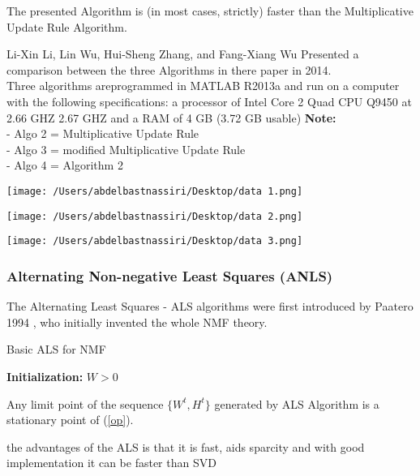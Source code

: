 \documentclass[aspectratio=169]{beamer}
\begin{document}
\begin{frame}
    \begin{theorem}
        The presented Algorithm is (in most cases, strictly) faster than the Multiplicative Update Rule
        Algorithm.
    \end{theorem}
\end{frame}
\begin{frame}
        Li-Xin Li, Lin Wu, Hui-Sheng Zhang, and Fang-Xiang Wu Presented a comparison between the three Algorithms
        in there paper in 2014.\\
        Three algorithms areprogrammed in MATLAB R2013a and run on a computer with the following specifications: 
        a processor of Intel Core 2 Quad CPU Q9450 at 2.66 GHZ 2.67 GHZ and a RAM of 4 GB (3.72 GB usable)
        \textbf{Note:}\\ 
        - Algo 2 = Multiplicative Update Rule\\
        - Algo 3 = modified Multiplicative Update Rule\\
        - Algo 4 = Algorithm 2
\end{frame}
\begin{frame}
    \texttt{[image: /Users/abdelbastnassiri/Desktop/data 1.png]}
\end{frame}
\begin{frame}
    \texttt{[image: /Users/abdelbastnassiri/Desktop/data 2.png]}
\end{frame}
\begin{frame}
    \texttt{[image: /Users/abdelbastnassiri/Desktop/data 3.png]}
\end{frame}
\begin{frame}
    \frametitle{Alternating Non-negative Least Squares (ANLS)}
    The Alternating Least Squares - ALS algorithms were first introduced by Paatero 1994 , 
    who initially invented the whole NMF theory.
    \begin{algorithm}[H]
        \caption{Basic ALS for NMF}
        \textbf{Initialization:} $W > 0$\;
    \end{algorithm}
\end{frame}
\begin{frame}
    \begin{theorem}
        Any limit point of the sequence $\{W^{t} , H^{t}\}$ generated by ALS Algorithm  is a stationary point of (\ref{op}).
    \end{theorem}
    the advantages of the ALS is that it is fast, aids sparcity and with good implementation it can be faster 
    than SVD    
\end{frame}
\end{document}
